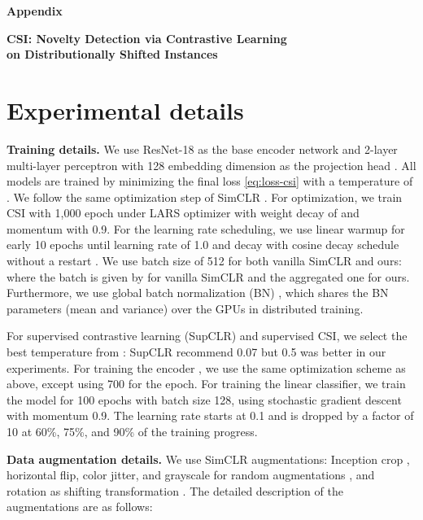 \documentclass{article}
\begin{document}
 
\nocite{lee2017confident,yun2020regularizing}



\appendix

\onecolumn
\clearpage
\begin{center}{\bf {\LARGE Appendix}}
\end{center}
\begin{center}{\bf {\Large CSI: Novelty Detection via Contrastive Learning\\on Distributionally Shifted Instances}}
\end{center}

\vspace{0.1in}
\section{Experimental details}
\label{appx:details}

\textbf{Training details.}
We use ResNet-18 \citep{he2016deep} as the base encoder network  and 2-layer multi-layer perceptron with 128 embedding dimension as the projection head . All models are trained by minimizing the final loss  \eqref{eq:loss-csi} with a temperature of . We follow the same optimization step of SimCLR \citep{chen2020simple}. For optimization, we train CSI with 1,000 epoch under LARS optimizer \citep{you2017large} with weight decay of  and momentum with 0.9. For the learning rate scheduling, we use linear warmup \citep{goyal2017accurate} for early 10 epochs until learning rate of 1.0 and decay with cosine decay schedule without a restart \citep{loshchilov2016sgdr}. We use batch size of 512 for both vanilla SimCLR and ours: where the batch is given by  for vanilla SimCLR and the aggregated one  for ours. Furthermore, we use global batch normalization (BN) \citep{ioffe2015batch}, which shares the BN parameters (mean and variance) over the GPUs in distributed training.


For supervised contrastive learning (SupCLR) \citep{khosla2020supervised} and supervised CSI, we select the best temperature from : SupCLR recommend 0.07 but 0.5 was better in our experiments. For training the encoder , we use the same optimization scheme as above, except using 700 for the epoch. For training the linear classifier, we train the model for 100 epochs with batch size 128, using stochastic gradient descent with momentum 0.9. The learning rate starts at 0.1 and is dropped by a factor of 10 at 60\%, 75\%, and 90\% of the training progress.

\textbf{Data augmentation details.} We use SimCLR augmentations: Inception crop \citep{szegedy2015going}, horizontal flip, color jitter, and grayscale for random augmentations , and rotation as shifting transformation . The detailed description of the augmentations are as follows:
\end{document}
